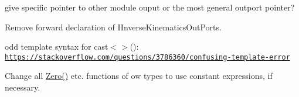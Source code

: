 \begin{DoxyRefList}
\item[\label{todo__todo000010}%
\hypertarget{todo__todo000010}{}%
Member \hyperlink{classow__core_1_1IFootTrajectoryGenerator_ae592f6abe58e94f8197a4b29d4f52b6d}{ow\+\_\+core\+:\+:I\+Foot\+Trajectory\+Generator\+:\+:connect\+In\+Port\+Forward\+Kinematic} (const I\+Forward\+Kinematics\+Out\+Ports $\ast$fk)=0]give specific pointer to other module ouput or the most general outport pointer? 
\item[\label{todo__todo000011}%
\hypertarget{todo__todo000011}{}%
Class \hyperlink{classow__core_1_1IRobot}{ow\+\_\+core\+:\+:I\+Robot} ]Remove forward declaration of I\+Inverse\+Kinematics\+Out\+Ports.  
\item[\label{todo__todo000004}%
\hypertarget{todo__todo000004}{}%
Member \hyperlink{conversions_8h_ab69f6bd2757103d471a24f3c48c4d34b}{ow\+\_\+core\+:\+:vector3\+Eigen\+To\+Vector3\+Msg} (const Eigen\+::\+Matrix\+Base$<$ \+\_\+\+Derived $>$ \&e, geometry\+\_\+msgs\+::\+Vector3 \&t)]odd template syntax for cast$<$$>$()\+: \href{https://stackoverflow.com/questions/3786360/confusing-template-error}{\tt https\+://stackoverflow.\+com/questions/3786360/confusing-\/template-\/error}  
\item[\label{todo__todo000012}%
\hypertarget{todo__todo000012}{}%
Member \hyperlink{classow__core_1_1VectorDof_a9e6be2c39b494db7b7d4ed62bdf6cbe3}{ow\+\_\+core\+:\+:Vector\+Dof$<$ \+\_\+\+Scalar, \+\_\+\+Rows $>$\+:\+:Zero} ()]Change all \hyperlink{classow__core_1_1VectorDof_a9e6be2c39b494db7b7d4ed62bdf6cbe3}{Zero()} etc. functions of ow types to use constant expressions, if necessary. 
\end{DoxyRefList}